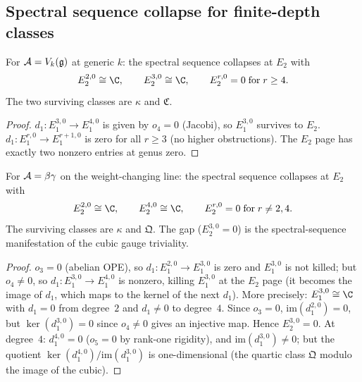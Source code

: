 
\subsection{Spectral sequence collapse for finite-depth classes}
\label{subsec:thqg-ss-collapse}

\begin{proposition}
\label{prop:thqg-collapse-L}
\ClaimStatusProvedHere
{}
For $\mathcal{A} = V_k(\mathfrak{g})$ at generic $k$:
the spectral sequence collapses at $E_2$ with
\begin{equation}\label{eq:thqg-collapse-L}
E_2^{2,0} \cong \C,
\qquad
E_2^{3,0} \cong \C,
\qquad
E_2^{r,0} = 0 \;\text{for}\; r \geq 4.
\end{equation}
The two surviving classes are $\kappa$ and $\mathfrak{C}$.
\end{proposition}

\begin{proof}
$d_1\colon E_1^{3,0} \to E_1^{4,0}$ is given by $o_4 = 0$
(Jacobi), so $E_1^{3,0}$ survives to $E_2$.
$d_1\colon E_1^{r,0} \to E_1^{r+1,0}$ is zero for all
$r \geq 3$ (no higher obstructions). The $E_2$ page has
exactly two nonzero entries at genus zero.
\end{proof}

\begin{proposition}
\label{prop:thqg-collapse-C}
\ClaimStatusProvedHere
{}
For $\mathcal{A} = \beta\gamma$ on the weight-changing line:
the spectral sequence collapses at $E_2$ with
\begin{equation}\label{eq:thqg-collapse-C}
E_2^{2,0} \cong \C,
\qquad
E_2^{4,0} \cong \C,
\qquad
E_2^{r,0} = 0 \;\text{for}\; r \neq 2, 4.
\end{equation}
The surviving classes are $\kappa$ and $\mathfrak{Q}$.
The gap ($E_2^{3,0} = 0$) is the spectral-sequence
manifestation of the cubic gauge triviality.
\end{proposition}

\begin{proof}
$o_3 = 0$ (abelian OPE), so $d_1\colon E_1^{2,0} \to E_1^{3,0}$
is zero and $E_1^{3,0}$ is not killed; but $o_4 \neq 0$, so
$d_1\colon E_1^{3,0} \to E_1^{4,0}$ is nonzero, killing
$E_1^{3,0}$ at the $E_2$ page (it becomes the image of
$d_1$, which maps to the kernel of the next $d_1$).
More precisely: $E_1^{3,0} \cong \C$ with $d_1 = 0$ from
degree~$2$ and $d_1 \neq 0$ to degree~$4$. Since $o_3 = 0$,
$\mathrm{im}(d_1^{2,0}) = 0$, but
$\ker(d_1^{3,0}) = 0$ since $o_4 \neq 0$
gives an injective map. Hence $E_2^{3,0} = 0$.
At degree~$4$: $d_1^{4,0} = 0$ ($o_5 = 0$ by rank-one
rigidity), and $\mathrm{im}(d_1^{3,0}) \neq 0$; but the
quotient $\ker(d_1^{4,0})/\mathrm{im}(d_1^{3,0})$ is
one-dimensional (the quartic class $\mathfrak{Q}$ modulo
the image of the cubic).
\end{proof}


